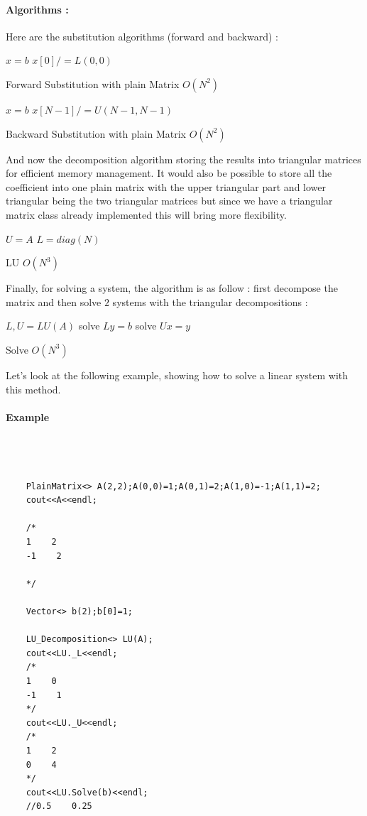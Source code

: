 \documentclass[a4paper]{report}
\begin{document}
\paragraph{Algorithms :}
Here are the substitution algorithms (forward and backward) : 
\\
\begin{algorithm}[H]
 $x=b$\;
 $x[0]/=L(0,0)$\;
 \caption{Forward Substitution with plain Matrix $O(N^2)$}
\end{algorithm}

\begin{algorithm}[H]
 $x=b$\;
 $x[N-1]/=U(N-1,N-1)$\;
 \caption{Backward Substitution with plain Matrix $O(N^2)$}
\end{algorithm}
And now the decomposition algorithm storing the results into triangular matrices for efficient memory management. It would also be possible to store all the coefficient into one plain matrix with the upper triangular part and lower triangular being the two triangular matrices but since we have a triangular matrix class already implemented this will bring more flexibility.
\\
\begin{algorithm}[H]
 $U=A$\;
 $L=diag(N)$\;
\caption{LU $O(N^3)$}
\end{algorithm}
Finally, for solving a system, the algorithm is as follow : first decompose the matrix and then solve $2$ systems with the triangular decompositions :
\begin{algorithm}[H]
 $L,U=LU(A)$\;
 solve $ Ly = b$\;
 solve $ Ux = y$\;
\caption{Solve $O(N^3)$}
\end{algorithm}
Let's look at the following example, showing how to solve a linear system with this method.
\paragraph{Example}
\begin{lstlisting}[basicstyle=\tiny]



    PlainMatrix<> A(2,2);A(0,0)=1;A(0,1)=2;A(1,0)=-1;A(1,1)=2;
    cout<<A<<endl;
   
    /*
    1    2
    -1    2
   
    */

    Vector<> b(2);b[0]=1;
   
    LU_Decomposition<> LU(A);
    cout<<LU._L<<endl;
    /*
    1    0
    -1    1
    */
    cout<<LU._U<<endl;
    /*
    1    2
    0    4
    */
    cout<<LU.Solve(b)<<endl;
    //0.5    0.25



\end{lstlisting}
\end{document}
